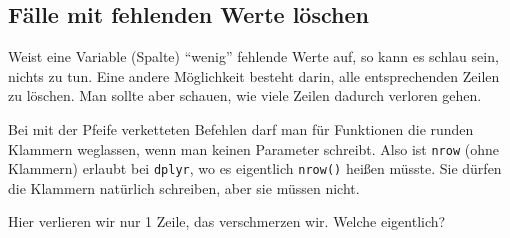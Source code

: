 \documentclass[12pt,ngerman,]{book}
\makeatletter
\newenvironment{Shaded}{\begin{snugshade}}{\end{snugshade}}
\newcommand{\KeywordTok}[1]{\textcolor[rgb]{0.13,0.29,0.53}{\textbf{{#1}}}}
\newcommand{\StringTok}[1]{\textcolor[rgb]{0.31,0.60,0.02}{{#1}}}
\newcommand{\CommentTok}[1]{\textcolor[rgb]{0.56,0.35,0.01}{\textit{{#1}}}}
\newcommand{\NormalTok}[1]{{#1}}
\newenvironment{kframe}{%
\medskip{}
\setlength{\fboxsep}{.8em}
 \def\at@end@of@kframe{}%
 \ifinner\ifhmode%
  \def\at@end@of@kframe{\end{minipage}}%
  \begin{minipage}{\columnwidth}%
 \fi\fi%
 \def\FrameCommand##1{\hskip\@totalleftmargin \hskip-\fboxsep
 \colorbox{shadecolor}{##1}\hskip-\fboxsep
     \hskip-\linewidth \hskip-\@totalleftmargin \hskip\columnwidth}%
 \MakeFramed {\advance\hsize-\width
   \@totalleftmargin\z@ \linewidth\hsize
   \@setminipage}}%
 {\par\unskip\endMakeFramed%
 \at@end@of@kframe}
\renewenvironment{Shaded}{\begin{kframe}}{\end{kframe}}
\let\BeginKnitrBlock\begin \let\EndKnitrBlock\end
\makeatother
\begin{document}
\subsection{Fälle mit fehlenden Werte
löschen}\label{falle-mit-fehlenden-werte-loschen}

Weist eine Variable (Spalte) ``wenig'' fehlende Werte auf, so kann es
schlau sein, nichts zu tun. Eine andere Möglichkeit besteht darin, alle
entsprechenden Zeilen zu löschen. Man sollte aber schauen, wie viele
Zeilen dadurch verloren gehen.

\begin{Shaded}
\end{Shaded}

\BeginKnitrBlock{rmdcaution}
Bei mit der Pfeife verketteten Befehlen darf man für Funktionen die
runden Klammern weglassen, wenn man keinen Parameter schreibt. Also ist
\texttt{nrow} (ohne Klammern) erlaubt bei \texttt{dplyr}, wo es
eigentlich \texttt{nrow()} heißen müsste. Sie dürfen die Klammern
natürlich schreiben, aber sie müssen nicht.
\EndKnitrBlock{rmdcaution}

Hier verlieren wir nur 1 Zeile, das verschmerzen wir. Welche eigentlich?

\begin{Shaded}
\end{Shaded}
\end{document}
